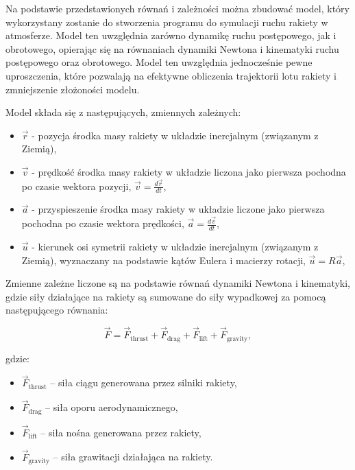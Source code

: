 Na podstawie przedstawionych równań i zależności można zbudować model, który
wykorzystany zostanie do stworzenia programu do symulacji ruchu rakiety w
atmosferze. Model ten uwzględnia zarówno dynamikę ruchu postępowego, jak i
obrotowego, opierając się na równaniach dynamiki Newtona i kinematyki ruchu
postępowego oraz obrotowego. Model ten uwzględnia jednocześnie pewne
uproszczenia, które pozwalają na efektywne obliczenia trajektorii lotu
rakiety i zmniejszenie złożoności modelu.

Model składa się z następujących, zmiennych zależnych:

\begin{itemize}
    \item \textbf{$\vec{r}$} - pozycja środka masy rakiety w układzie
    inercjalnym (związanym z Ziemią),
    \item \textbf{$\vec{v}$} - prędkość środka masy rakiety w układzie
    liczona jako pierwsza pochodna po czasie wektora pozycji,
    $\vec{v} = \frac{d\vec{r}}{dt}$,
    \item \textbf{$\vec{a}$} - przyspieszenie środka masy rakiety w układzie
    liczone jako pierwsza pochodna po czasie wektora prędkości, $\vec{a} = \frac{d\vec{v}}{dt}$,
    \item \textbf{$\vec{u}$} - kierunek osi symetrii rakiety w układzie
    inercjalnym (związanym z Ziemią), wyznaczany na podstawie kątów Eulera i
    macierzy rotacji, $\vec{u} = R \vec{a}$,
\end{itemize}

Zmienne zależne liczone są na podstawie równań dynamiki Newtona i
kinematyki, gdzie siły działające na rakiety są sumowane do siły wypadkowej za
pomocą
następującego równania:

\begin{equation}
    \vec{F} = \vec{F}_\text{thrust} + \vec{F}_\text{drag} + \vec{F}_\text{lift} + \vec{F}_\text{gravity},
    \label{eq:forces_sum}
\end{equation}

gdzie:
\begin{itemize}
    \item $\vec{F}_\text{thrust}$ -- siła ciągu generowana przez silniki rakiety,
    \item $\vec{F}_\text{drag}$ -- siła oporu aerodynamicznego,
    \item $\vec{F}_\text{lift}$ -- siła nośna generowana przez rakiety,
    \item $\vec{F}_\text{gravity}$ -- siła grawitacji działająca na rakiety.
\end{itemize}

